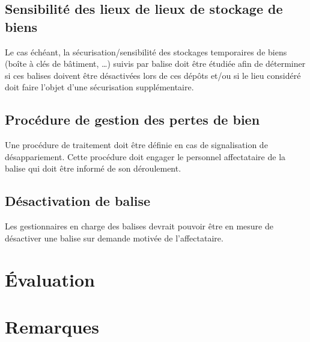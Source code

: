 \documentclass[headings=small,cmyk,french,a4paper,twocolumn,garamond,11pt]{scrartcl}
\begin{document}
\subsection{Sensibilité des lieux de lieux de stockage de biens}

Le cas échéant, la sécurisation/sensibilité des stockages temporaires
de biens (boîte à clés de bâtiment, \ldots) suivis par balise doit
être étudiée afin de déterminer si ces balises doivent être
désactivées lors de ces dépôts et/ou si le lieu considéré doit faire
l'objet d'une sécurisation supplémentaire.


\subsection{Procédure de gestion des pertes de bien}

Une procédure de traitement doit être définie en cas de signalisation
de désappariement.  Cette procédure doit engager le personnel
affectataire de la balise qui doit être informé de son déroulement.

\subsection{Désactivation de  balise}

Les gestionnaires en charge des balises devrait pouvoir être en mesure
de désactiver une balise sur demande motivée de l'affectataire.

\onecolumn{}
\renewcommand{\dtlbeforecols}{|}
\renewcommand{\dtldisplaystarttab}{\hline}
\renewcommand{\dtldisplayafterhead}{\hline}
\begin{landscape}
  \section*{Évaluation}
  \section*{Remarques}
\end{landscape}
\end{document}

